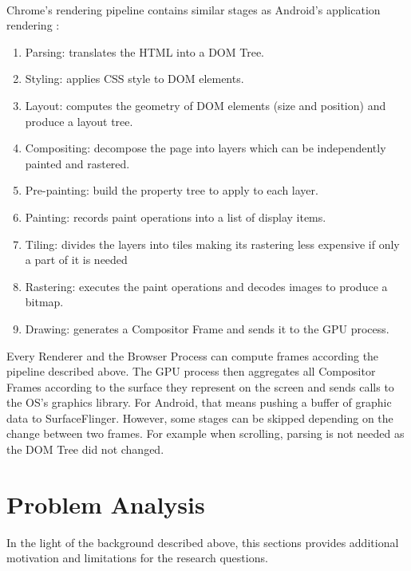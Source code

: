 \documentclass{kththesis}
\begin{document}
\paragraph{}
Chrome's rendering pipeline contains similar stages as Android's application rendering \cite{chrome_pixel}:
\begin{enumerate}
    \item Parsing: translates the HTML into a DOM Tree.
    \item Styling: applies CSS style to DOM elements.
    \item Layout: computes the geometry of DOM elements (size and position) and produce a layout tree.
    \item Compositing: decompose the page into layers which can be independently painted and rastered.
    \item Pre-painting: build the property tree to apply to each layer.
    \item Painting: records paint operations into a list of display items.
    \item Tiling: divides the layers into tiles making its rastering less expensive if only a part of it is needed
    \item Rastering: executes the paint operations and decodes images to produce a bitmap.
    \item Drawing: generates a Compositor Frame and sends it to the GPU process.
\end{enumerate}
Every Renderer and the Browser Process can compute frames according the pipeline described above. The GPU process then aggregates all Compositor Frames according to the surface they represent on the screen  and sends calls to the OS's graphics library. For Android, that means pushing a buffer of graphic data to SurfaceFlinger.
\newline
However, some stages can be skipped depending on the change between two frames. For example when scrolling, parsing is not needed as the DOM Tree did not changed.

\section{Problem Analysis}

In the light of the background described above, this sections provides additional motivation and limitations for the research questions. 
\paragraph{}
\end{document}
